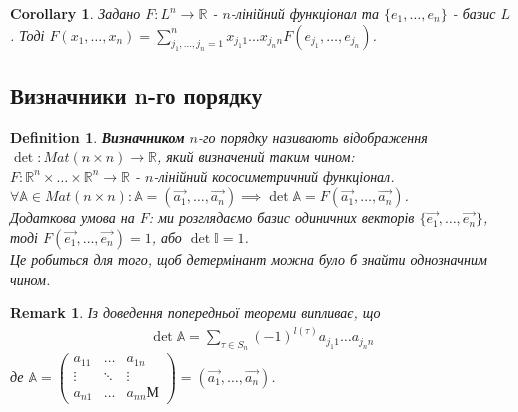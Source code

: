 \documentclass[a4paper, 10pt]{article}
\theoremstyle{theoremdd}
\newtheorem{definition}[theorem]{Definition}
\newtheorem{remark}[theorem]{Remark}
\newtheorem{corollary}[theorem]{Corollary}
\begin{document}
\begin{corollary}
Задано $F: L^n \to \mathbb{R}$ - $n$-лінійний функціонал та $\{e_1,\dots,e_n\}$ - базис $L$. Тоді $F(x_1,\dots,x_n) = \displaystyle\sum_{j_1,\dots,j_n=1}^n x_{j_1 1}\dots x_{j_n n} F(e_{j_1},\dots,e_{j_n})$.
\end{corollary}

\subsection{Визначники n-го порядку}
\begin{definition}
\textbf{Визначником} $n$-го порядку називають відображення $\det : Mat(n \times n) \to \mathbb{R}$, який визначений таким чином:\\
$F: \mathbb{R}^n \times \dots \times \mathbb{R}^n \to \mathbb{R}$ - $n$-лінійний кососиметричний функціонал.\\
$\forall \mathbb{A} \in Mat(n \times n): \mathbb{A} = (\vec{a_1},\dots, \vec{a_n}) \implies \det \mathbb{A} = F(\vec{a_1},\dots,\vec{a_n})$.\\
Додаткова умова на $F$: ми розглядаємо базис одиничних векторів $\{\vec{e_1},\dots, \vec{e_n}\}$, тоді $F(\vec{e_1},\dots,\vec{e_n}) = 1$, або $\det \mathbb{I} = 1$.\\
\textit{Це робиться для того, щоб детермінант можна було б знайти однозначним чином.}
\end{definition}

\begin{remark}
Із доведення попередньої теореми випливає, що
\begin{align*}
\det \mathbb{A} = \displaystyle \sum_{\tau \in S_n} (-1)^{l(\tau)} a_{j_1 1}\dots a_{j_n n}
\end{align*}
де $\mathbb{A} = \begin{pmatrix}
 a_{11} & \dots & a_{1n} \\
 \vdots & \ddots &\vdots \\
 a_{n1} & \dots & a_{nn}М
\end{pmatrix} = (\vec{a_1}, \dots, \vec{a_n})$.
\end{remark}
\end{document}
